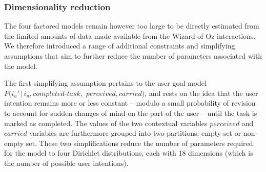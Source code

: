 \subsubsection*{Dimensionality reduction}


The four factored models remain however too large to be directly estimated from the limited amounts of data made available from the Wizard-of-Oz interactions.  We therefore introduced a range of additional constraints and simplifying assumptions that aim to further reduce the number of parameters associated with the model.


The first simplifying assumption pertains to the user goal model $P(i_u' \, | \, i_u, \mathit{completed\mbox{-}task},$ $\mathit{perceived}, \mathit{carried})$, and rests on the idea that the user intention remains more or less constant -- modulo a small probability of revision to account for sudden changes of mind on the part of the user -- until the task is marked as completed. The values of the two contextual variables $\mathit{perceived}$ and $\mathit{carried}$ variables are furthermore grouped into two partitions: empty set or non-empty set. These two simplifications reduce the number of parameters required for the model to four Dirichlet distributions, each with 18 dimensions (which is the number of possible user intentions). 

